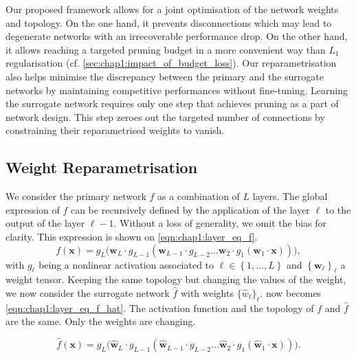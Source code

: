 Our proposed framework allows for a joint optimisation of the network weights
and topology. On the one hand, it prevents disconnections which may lead to
degenerate networks with an irrecoverable performance drop. On the other hand,
it allows reaching a targeted pruning budget in a more convenient way than $L_1$
regularisation (cf. \cref{sec:chap1:impact_of_budget_loss}). Our
reparametrisation also helps minimise the discrepancy between the primary and
the surrogate networks by maintaining competitive performances without
fine-tuning. Learning the surrogate network requires only one step that achieves
pruning as a part of network design. This step zeroes out the targeted number of
connections by constraining their reparametrised weights to vanish.


\subsection{Weight Reparametrisation}
\label{sec:chap1:weight_reparam}

We consider the primary network $f$ as a combination of $L$ layers. The global
expression of $f$ can be recursively defined by the application of the layer $\ell$
to the output of the layer $\ell-1$. Without a loss of generality, we omit the
bias for clarity. This expression is shown on
\cref{eqn:chap1:layer_eq_f}.
\begin{equation}
\label{eqn:chap1:layer_eq_f}
f(\mathbf{x}) = g_L \big(\mathbf{w}_L \cdot g_{L-1}(\mathbf{w}_{L-1} \cdot g_{L-2} \dots
\mathbf{w}_2 \cdot g_1(\mathbf{w}_1 \cdot \mathbf{x}))\big),
\end{equation}
\noindent with $g_\ell$ being a nonlinear activation associated to $\ell \in
\left\{ 1,\dots, L \right\}$ and $\left\{ \mathbf{w}_\ell \right\}_\ell$ a
weight tensor. Keeping the same topology but changing the values of the weight,
we now consider the surrogate network $\hat{f}$ with weights
$\{\hat{w}_\ell\}_\ell$.  now becomes
\cref{eqn:chap1:layer_eq_f_hat}. The activation function and the topology of $f$
and $\hat{f}$ are the same. Only the weights are changing.

\begin{equation}
\label{eqn:chap1:layer_eq_f_hat}
\hat{f}(\mathbf{x}) = g_L \big(\mathbf{\hat w}_L \cdot g_{L-1}(\mathbf{\hat w}_{L-1} \cdot g_{L-2}
\dots\mathbf{\hat w}_2 \cdot g_1(\mathbf{\hat w}_1 \cdot \mathbf{x}))\big).
\end{equation}

